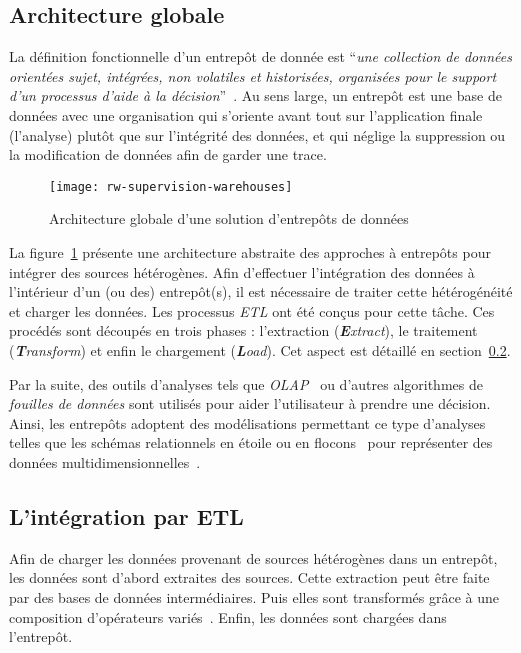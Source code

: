 \subsection{Architecture globale}
La définition fonctionnelle d'un entrepôt de donnée est \enquote{\it une collection de données orientées sujet, intégrées, non volatiles et historisées, organisées pour le support d’un processus d’aide à la décision}~\cite{Inmon:warehouse}. Au sens large, un entrepôt est une base de données avec une organisation qui s'oriente avant tout sur l'application finale (l'analyse) plutôt que sur l'intégrité des données, et qui néglige la suppression ou la modification de données afin de garder une trace.
\begin{figure}[ht]
	\centering
	\texttt{[image: rw-supervision-warehouses]}
	\caption{Architecture globale d'une solution d'entrepôts de données}\label{fig:rw:supervision:warehouses}
\end{figure}
La figure~\ref{fig:rw:supervision:warehouses} présente une architecture abstraite des approches à entrepôts pour intégrer des sources hétérogènes. Afin d'effectuer l'intégration des données à l'intérieur d'un (ou des) entrepôt(s), il est nécessaire de traiter cette hétérogénéité et charger les données. Les processus \textit{ETL} ont été conçus pour cette tâche. Ces procédés sont découpés en trois phases : l'extraction (\textit{\textbf{E}xtract}), le traitement (\textit{\textbf{T}ransform}) et enfin le chargement (\textit{\textbf{L}oad}). Cet aspect est détaillé en section~\ref{sec:rw:supervision:warehouse:etl}.

Par la suite, des outils d'analyses tels que \textit{OLAP}~\cite{Codd:olap} ou d'autres algorithmes de \textit{fouilles de données} sont utilisés pour aider l'utilisateur à prendre une décision. Ainsi, les entrepôts adoptent des modélisations permettant ce type d'analyses telles que les schémas relationnels en étoile ou en flocons~\cite{Levene:snowflake} pour représenter des données multidimensionnelles~\cite{Gray:cube}.

\subsection{L'intégration par ETL}\label{sec:rw:supervision:warehouse:etl}
Afin de charger les données provenant de sources hétérogènes dans un entrepôt, les données sont d'abord extraites des sources. Cette extraction peut être faite par des bases de données intermédiaires. Puis elles sont transformés grâce à une composition d'opérateurs variés~\cite{Vassiliadis:taxonomy}. Enfin, les données sont chargées dans l'entrepôt.

